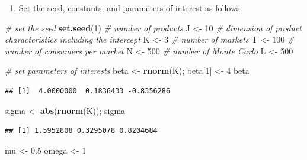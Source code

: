 \documentclass[]{book}
\newenvironment{Shaded}{\begin{snugshade}}{\end{snugshade}}
\newcommand{\KeywordTok}[1]{\textcolor[rgb]{0.13,0.29,0.53}{\textbf{#1}}}
\newcommand{\DecValTok}[1]{\textcolor[rgb]{0.00,0.00,0.81}{#1}}
\newcommand{\FloatTok}[1]{\textcolor[rgb]{0.00,0.00,0.81}{#1}}
\newcommand{\StringTok}[1]{\textcolor[rgb]{0.31,0.60,0.02}{#1}}
\newcommand{\CommentTok}[1]{\textcolor[rgb]{0.56,0.35,0.01}{\textit{#1}}}
\newcommand{\NormalTok}[1]{#1}
\providecommand{\tightlist}{%
  \setlength{\itemsep}{0pt}\setlength{\parskip}{0pt}}
\begin{document}
\begin{enumerate}
\def\labelenumi{\arabic{enumi}.}
\tightlist
\item
  Set the seed, constants, and parameters of interest as follows.
\end{enumerate}

\begin{Shaded}
\begin{Highlighting}[]
\CommentTok{# set the seed}
\KeywordTok{set.seed}\NormalTok{(}\DecValTok{1}\NormalTok{)}
\CommentTok{# number of products}
\NormalTok{J <-}\StringTok{ }\DecValTok{10}
\CommentTok{# dimension of product characteristics including the intercept}
\NormalTok{K <-}\StringTok{ }\DecValTok{3}
\CommentTok{# number of markets}
\NormalTok{T <-}\StringTok{ }\DecValTok{100}
\CommentTok{# number of consumers per market}
\NormalTok{N <-}\StringTok{ }\DecValTok{500}
\CommentTok{# number of Monte Carlo}
\NormalTok{L <-}\StringTok{ }\DecValTok{500}
\end{Highlighting}
\end{Shaded}

\begin{Shaded}
\begin{Highlighting}[]
\CommentTok{# set parameters of interests}
\NormalTok{beta <-}\StringTok{ }\KeywordTok{rnorm}\NormalTok{(K); }
\NormalTok{beta[}\DecValTok{1}\NormalTok{] <-}\StringTok{ }\DecValTok{4}
\NormalTok{beta}
\end{Highlighting}
\end{Shaded}

\begin{verbatim}
## [1]  4.0000000  0.1836433 -0.8356286
\end{verbatim}

\begin{Shaded}
\begin{Highlighting}[]
\NormalTok{sigma <-}\StringTok{ }\KeywordTok{abs}\NormalTok{(}\KeywordTok{rnorm}\NormalTok{(K)); sigma}
\end{Highlighting}
\end{Shaded}

\begin{verbatim}
## [1] 1.5952808 0.3295078 0.8204684
\end{verbatim}

\begin{Shaded}
\begin{Highlighting}[]
\NormalTok{mu <-}\StringTok{ }\FloatTok{0.5}
\NormalTok{omega <-}\StringTok{ }\DecValTok{1}
\end{Highlighting}
\end{Shaded}
\end{document}
